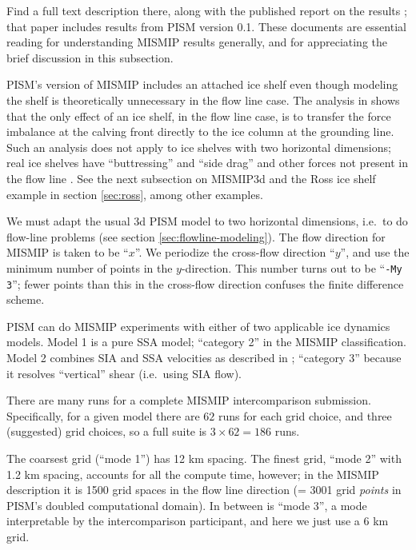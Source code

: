 \noindent Find a full text description there, along with the published report on the results \cite{MISMIP2012}; that paper includes results from PISM version 0.1.  These documents are essential reading for understanding MISMIP results generally, and for appreciating the brief discussion in this subsection.

PISM's version of MISMIP includes an attached ice shelf even though modeling the shelf is theoretically unnecessary in the flow line case.  The analysis in \cite{SchoofMarine1} shows that the only effect of an ice shelf, in the flow line case, is to transfer the force imbalance at the calving front directly to the ice column at the grounding line.  Such an analysis does not apply to ice shelves with two horizontal dimensions; real ice shelves have ``buttressing'' and ``side drag'' and other forces not present in the flow line \cite{Goldbergetal2009}.  See the next subsection on MISMIP3d and the Ross ice shelf example in section \ref{sec:ross}, among other examples.

We must adapt the usual 3d PISM model to two horizontal dimensions, i.e.~to do flow-line problems (see section \ref{sec:flowline-modeling}).  The flow direction for MISMIP is taken to be ``$x$''.  We periodize the cross-flow direction ``$y$'', and use the minimum number of points in the $y$-direction.  This number turns out to be ``\texttt{-My 3}''; fewer points than this in the cross-flow direction confuses the finite difference scheme.

PISM can do MISMIP experiments with either of two applicable ice dynamics models.  Model 1 is a pure SSA model; ``category 2'' in the MISMIP classification.  Model 2 combines SIA and SSA velocities as described in \cite{Winkelmannetal2011}; ``category 3'' because it resolves ``vertical'' shear (i.e.~using SIA flow).

There are many runs for a complete MISMIP intercomparison submission.  Specifically, for a given model there are $62$ runs for each grid choice, and three (suggested) grid choices, so a full suite is $3 \times 62 = 186$ runs.

The coarsest grid (``mode 1'') has 12 km spacing.  The finest grid, ``mode 2'' with 1.2 km spacing, accounts for all the compute time, however; in the MISMIP description it is 1500 grid spaces in the flow line direction (= 3001 grid \emph{points} in PISM's doubled computational domain).  In between is ``mode 3'', a mode interpretable by the intercomparison participant, and here we just use a 6 km grid.


